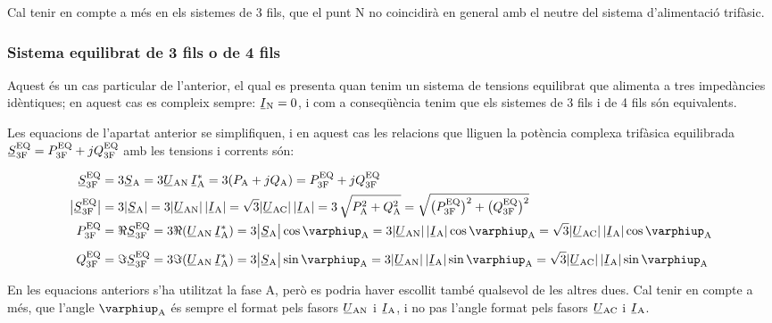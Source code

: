 Cal tenir en compte a més en els sistemes de 3 fils, que el punt
N no coincidirà en general amb el neutre del sistema
d'alimentació trifàsic.

\subsubsection{Sistema equilibrat de 3 fils o de 4 fils}

Aquest és un cas particular de l'anterior, el qual es presenta quan
tenim un sistema de tensions equilibrat que alimenta a tres
impedàncies idèntiques; en aquest cas es compleix sempre:
$\cmplx{I}\ped{N}=0$, i com a conseqüència tenim que els sistemes de 3
fils i de 4 fils són equivalents.

Les equacions de l'apartat anterior se simplifiquen, i en aquest
cas les relacions que lliguen la  potència complexa trifàsica
equilibrada $\cmplx{S}\ped{3F}\ap{EQ} = P\ped{3F}\ap{EQ} + j
Q\ped{3F}\ap{EQ}$ amb les tensions i corrents són:

\begin{align}
    \cmplx{S}\ped{3F}\ap{EQ} &= 3\cmplx{S}\ped{A} = 3\cmplx{U}\ped{AN}\, \cmplx{I}\ped{A}^* =
    3 (P\ped{A} + j Q\ped{A}) = P\ped{3F}\ap{EQ} +j Q\ped{3F}\ap{EQ} \label{eq:s_3f_eq}\\
    \big|\cmplx{S}\ped{3F}\ap{EQ}\big| &= 3|\cmplx{S}\ped{A} | =   3 |\cmplx{U}\ped{AN}| \,|\cmplx{I}\ped{A}| =
    \sqrt{3} |\cmplx{U}\ped{AC}|\, |\cmplx{I}\ped{A}| = 3\,\sqrt{P\ped{A}^2 + Q\ped{A}^2} =
    \sqrt{\big(P\ped{3F}\ap{EQ}\big)^2 + \big(Q\ped{3F}\ap{EQ}\big)^2} \\
    P\ped{3F}\ap{EQ} &= \Re\cmplx{S}\ped{3F}\ap{EQ} =3\Re(\cmplx{U}\ped{AN} \,\cmplx{I}\ped{A}^*) =
    3\big|\cmplx{S}\ped{A}\big| \cos \varphiup\ped{A} = 3 |\cmplx{U}\ped{AN}|\,
    |\cmplx{I}\ped{A}|\label{eq:p_3f_34}
    \cos \varphiup\ped{A} = \sqrt{3} |\cmplx{U}\ped{AC}|\,|\cmplx{I}\ped{A}| \cos \varphiup\ped{A} \\[2mm]
    Q\ped{3F}\ap{EQ} &= \Im\cmplx{S}\ped{3F}\ap{EQ}= 3\Im(\cmplx{U}\ped{AN}\, \cmplx{I}\ped{A}^*) =
    3\big|\cmplx{S}\ped{A}\big|  \sin \varphiup\ped{A} = 3 |\cmplx{U}\ped{AN}| \, |\cmplx{I}\ped{A}|\label{eq:q_3f_34}
    \sin\varphiup\ped{A}=\sqrt{3} |\cmplx{U}\ped{AC}|\,|\cmplx{I}\ped{A}|\sin \varphiup\ped{A}
\end{align}

En les equacions anteriors s'ha utilitzat la fase A, però es
podria haver escollit també qualsevol de les altres dues. Cal tenir
en compte a més, que l'angle $\varphiup\ped{A}$ és sempre el format
pels fasors $\cmplx{U}\ped{AN}$ i $\cmplx{I}\ped{A}$, i no pas
l'angle format pels fasors $\cmplx{U}\ped{AC}$ i
$\cmplx{I}\ped{A}$.

